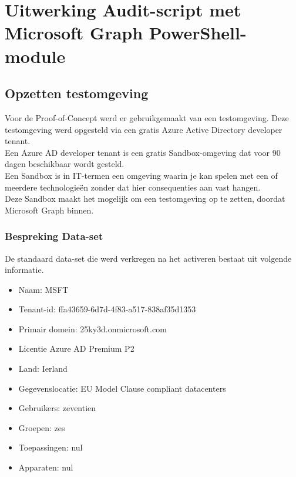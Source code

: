 
\chapter{Uitwerking Audit-script met Microsoft Graph PowerShell-module}%
\label{ch:poc}

\section{Opzetten testomgeving}

Voor de Proof-of-Concept werd er gebruikgemaakt van een testomgeving. Deze testomgeving werd opgesteld via een gratis Azure Active Directory developer tenant. \\

Een Azure \ac{AD} developer tenant is een gratis Sandbox-omgeving dat voor 90 dagen beschikbaar wordt gesteld. \\

Een Sandbox is in IT-termen een omgeving waarin je kan spelen met een of meerdere technologieën zonder dat hier consequenties aan vast hangen. \\

Deze Sandbox maakt het mogelijk om een testomgeving op te zetten, doordat Microsoft Graph binnen. \\


\subsection{Bespreking Data-set}




De standaard data-set die werd verkregen na het activeren bestaat uit volgende informatie.

\begin{itemize}
    \item Naam: MSFT
    \item Tenant-id: ffa43659-6d7d-4f83-a517-838af35d1353
    \item Primair domein: 25ky3d.onmicrosoft.com
    \item Licentie Azure AD Premium P2
    \item Land: Ierland
    \item Gegevenslocatie: EU Model Clause compliant datacenters
    \item Gebruikers: zeventien
    \item Groepen: zes
    \item Toepassingen: nul
    \item Apparaten: nul
\end{itemize}

